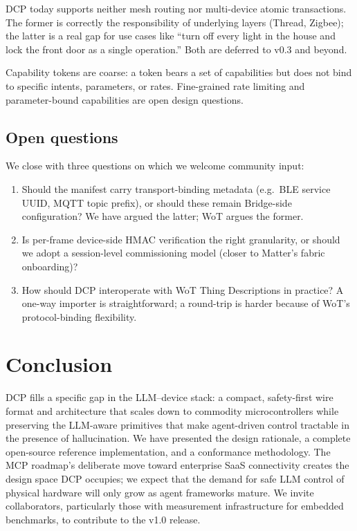 \documentclass[11pt,a4paper]{article}
\begin{document}
DCP today supports neither mesh routing nor multi-device atomic
transactions. The former is correctly the responsibility of underlying
layers (Thread, Zigbee); the latter is a real gap for use cases like
``turn off every light in the house and lock the front door as a single
operation.'' Both are deferred to v0.3 and beyond.

Capability tokens are coarse: a token bears a set of capabilities but does
not bind to specific intents, parameters, or rates. Fine-grained rate
limiting and parameter-bound capabilities are open design questions.

\subsection{Open questions}

We close with three questions on which we welcome community input:

\begin{enumerate}[leftmargin=*,nosep]
  \item Should the manifest carry transport-binding metadata
        (e.g.\ BLE service UUID, MQTT topic prefix), or should these
        remain Bridge-side configuration? We have argued the latter; WoT
        argues the former.
  \item Is per-frame device-side HMAC verification the right granularity,
        or should we adopt a session-level commissioning model (closer
        to Matter's fabric onboarding)?
  \item How should DCP interoperate with WoT Thing Descriptions in practice?
        A one-way importer is straightforward; a round-trip is harder
        because of WoT's protocol-binding flexibility.
\end{enumerate}

\section{Conclusion}

DCP fills a specific gap in the LLM--device stack: a compact, safety-first
wire format and architecture that scales down to commodity microcontrollers
while preserving the LLM-aware primitives that make agent-driven control
tractable in the presence of hallucination. We have presented the design
rationale, a complete open-source reference implementation, and a
conformance methodology. The MCP roadmap's deliberate move toward
enterprise SaaS connectivity creates the design space DCP occupies; we
expect that the demand for safe LLM control of physical hardware will only
grow as agent frameworks mature. We invite collaborators, particularly
those with measurement infrastructure for embedded benchmarks, to
contribute to the v1.0 release.



\end{document}
